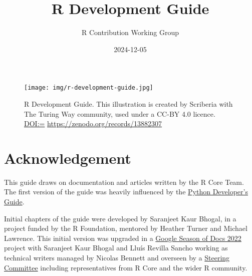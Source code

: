 \documentclass[
]{book}
\title{R Development Guide}
\author{R Contribution Working Group}
\date{2024-12-05}
\let\oldmaketitle\maketitle
\begin{document}
\maketitle


\newpage

\let\maketitle\oldmaketitle
\maketitle

{
\setcounter{tocdepth}{1}
\tableofcontents
}
\chapter*{}\label{section}

\begin{figure}
\centering
\texttt{[image: img/r-development-guide.jpg]}
\caption{R Development Guide. This illustration is created by Scriberia with The Turing Way community, used under a CC-BY 4.0 licence. \url{DOI:=} \url{https://zenodo.org/records/13882307}}
\end{figure}

\chapter*{Acknowledgement}\label{acknowledgement}

This guide draws on documentation and articles written by the R Core Team. The first version of the guide was heavily influenced by the \href{https://devguide.python.org/}{Python Developer's Guide}.

Initial chapters of the guide were developed by Saranjeet Kaur Bhogal, in a project funded by the R Foundation, mentored by Heather Turner and Michael Lawrence. This initial version was upgraded in a \href{https://github.com/rstats-gsod/gsod2022/wiki/GSOD-2022-Proposal}{Google Season of Docs 2022} project with Saranjeet Kaur Bhogal and Lluís Revilla Sancho working as technical writers managed by Nicolas Bennett and overseen by a \href{https://github.com/rstats-gsod/gsod2022/wiki/GSOD-2022-Proposal\#steering-committee}{Steering Committee} including representatives from R Core and the wider R community.
\end{document}
